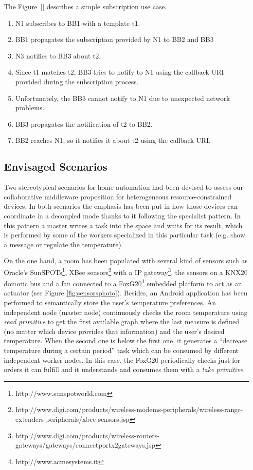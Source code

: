 The Figure~\ref{} describes a simple subscription use case.
\begin{enumerate}
  \item N1 subscribes to BB1 with a template t1.
  \item BB1 propagates the subscription provided by N1 to BB2 and BB3
  \item N3 notifies to BB3 about t2.
  \item Since t1 matches t2, BB3 tries to notify to N1 using the callback URI provided during the subscription process.
  \item Unfortunately, the BB3 cannot notify to N1 due to unexpected network problems.
  \item BB3 propagates the notification of t2 to BB2.
  \item BB2 reaches N1, so it notifies it about t2 using the callback URI.
\end{enumerate}




\subsection{Envisaged Scenarios}
\label{sec:envisaged_scenarios}

Two stereotypical scenarios for home automation had been devised to assess our collaborative middleware proposition for heterogeneous resource-constrained devices.
In both scenarios the emphasis has been put in how those devices can coordinate in a decoupled mode thanks to it following the specialist pattern.
In this pattern a master writes a task into the space and waits for its result, which is performed by some of the workers specialized in this particular task (e.g. show a message or regulate the temperature).

On the one hand, a room has been populated with several kind of sensors such as Oracle's SunSPOTs\footnote{http://www.sunspotworld.com},
XBee sensors\footnote{http://www.digi.com/products/wireless-modems-peripherals/wireless-range-extenders-peripherals/xbee-sensors.jsp} with a IP gateway\footnote{http://www.digi.com/products/wireless-routers-gateways/gateways/connectportx2gateways.jsp},
the sensors on a KNX20 domotic bus and a fan connected to a FoxG20\footnote{http://www.acmesystems.it} embedded platform to act as an actuator (see Figure \ref{fig:sensorsphoto}).
Besides, an Android application has been performed to semantically store the user's temperature preferences.
An independent node (master node) continuously checks the room temperature using \textit{read primitive} to get the first available graph where the last measure is defined (no matter which device provides that information) and the user's desired temperature.
When the second one is below the first one, it generates a ``decrease temperature during a certain period'' task which can be consumed by different independent worker nodes.
In this case, the FoxG20 periodically checks just for orders it can fulfill and it understands and consumes them with a \textit{take primitive}.

